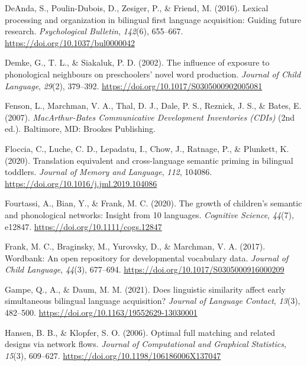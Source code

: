 \documentclass[
  ,man,floatsintext]{apa6}
\newlength{\cslhangindent}
\newlength{\cslentryspacingunit} %
\newenvironment{CSLReferences}[2] %
 {%
  \setlength{\parindent}{0pt}
  \ifodd #1
  \let\oldpar\par
  \def\par{\hangindent=\cslhangindent\oldpar}
  \fi
  \setlength{\parskip}{#2\cslentryspacingunit}
 }%
 {}
\begin{document}
\begin{CSLReferences}{1}{0}
\leavevmode{}%
DeAnda, S., Poulin-Dubois, D., Zesiger, P., \& Friend, M. (2016). Lexical processing and organization in bilingual first language acquisition: Guiding future research. \emph{Psychological Bulletin}, \emph{142}(6), 655--667. \url{https://doi.org/10.1037/bul0000042}

\leavevmode{}%
Demke, G., T. L., \& Siakaluk, P. D. (2002). The influence of exposure to phonological neighbours on preschoolers' novel word production. \emph{Journal of Child Language}, \emph{29}(2), 379--392. \url{https://doi.org/10.1017/S0305000902005081}

\leavevmode{}%
Fenson, L., Marchman, V. A., Thal, D. J., Dale, P. S., Reznick, J. S., \& Bates, E. (2007). \emph{MacArthur-{B}ates {C}ommunicative {D}evelopment {I}nventories ({CDIs})} (2nd ed.). Baltimore, MD: Brookes Publishing.

\leavevmode{}%
Floccia, C., Luche, C. D., Lepadatu, I., Chow, J., Ratnage, P., \& Plunkett, K. (2020). Translation equivalent and cross-language semantic priming in bilingual toddlers. \emph{Journal of Memory and Language}, \emph{112}, 104086. \url{https://doi.org/10.1016/j.jml.2019.104086}

\leavevmode{}%
Fourtassi, A., Bian, Y., \& Frank, M. C. (2020). The growth of children's semantic and phonological networks: Insight from 10 languages. \emph{Cognitive Science}, \emph{44}(7), e12847. \url{https://doi.org/10.1111/cogs.12847}

\leavevmode{}%
Frank, M. C., Braginsky, M., Yurovsky, D., \& Marchman, V. A. (2017). Wordbank: An open repository for developmental vocabulary data. \emph{Journal of Child Language}, \emph{44}(3), 677--694. \url{https://doi.org/10.1017/S0305000916000209}

\leavevmode{}%
Gampe, Q., A., \& Daum, M. M. (2021). Does linguistic similarity affect early simultaneous bilingual language acquisition? \emph{Journal of Language Contact}, \emph{13}(3), 482--500. \url{https://doi.org/10.1163/19552629-13030001}

\leavevmode{}%
Hansen, B. B., \& Klopfer, S. O. (2006). Optimal full matching and related designs via network flows. \emph{Journal of Computational and Graphical Statistics}, \emph{15}(3), 609--627. \url{https://doi.org/10.1198/106186006X137047}


\end{CSLReferences}
\end{document}
